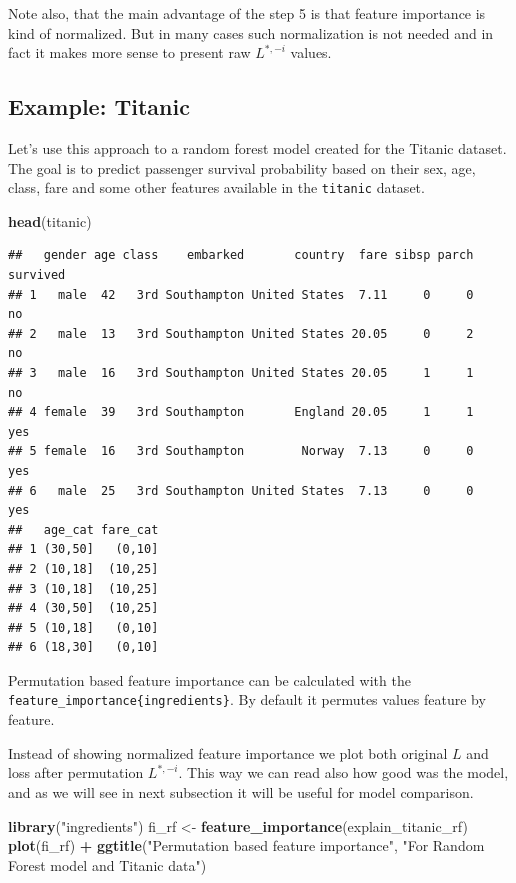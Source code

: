 \documentclass[12pt,]{krantz}
\newenvironment{Shaded}{\begin{snugshade}}{\end{snugshade}}
\newcommand{\KeywordTok}[1]{\textcolor[rgb]{0.13,0.29,0.53}{\textbf{#1}}}
\newcommand{\NormalTok}[1]{#1}
\newcommand{\OperatorTok}[1]{\textcolor[rgb]{0.81,0.36,0.00}{\textbf{#1}}}
\newcommand{\StringTok}[1]{\textcolor[rgb]{0.31,0.60,0.02}{#1}}
\theoremstyle{definition}
\theoremstyle{definition}
\theoremstyle{definition}
\theoremstyle{remark}
\begin{document}
Note also, that the main advantage of the step 5 is that feature
importance is kind of normalized. But in many cases such normalization
is not needed and in fact it makes more sense to present raw
\(L^{*,-i}\) values.

\hypertarget{example-titanic-1}{%
\subsection{Example: Titanic}\label{example-titanic-1}}

Let's use this approach to a random forest model created for the Titanic
dataset. The goal is to predict passenger survival probability based on
their sex, age, class, fare and some other features available in the
\texttt{titanic} dataset.

\begin{Shaded}
\begin{Highlighting}[]
\KeywordTok{head}\NormalTok{(titanic)}
\end{Highlighting}
\end{Shaded}

\begin{verbatim}
##   gender age class    embarked       country  fare sibsp parch survived
## 1   male  42   3rd Southampton United States  7.11     0     0       no
## 2   male  13   3rd Southampton United States 20.05     0     2       no
## 3   male  16   3rd Southampton United States 20.05     1     1       no
## 4 female  39   3rd Southampton       England 20.05     1     1      yes
## 5 female  16   3rd Southampton        Norway  7.13     0     0      yes
## 6   male  25   3rd Southampton United States  7.13     0     0      yes
##   age_cat fare_cat
## 1 (30,50]   (0,10]
## 2 (10,18]  (10,25]
## 3 (10,18]  (10,25]
## 4 (30,50]  (10,25]
## 5 (10,18]   (0,10]
## 6 (18,30]   (0,10]
\end{verbatim}

Permutation based feature importance can be calculated with the
\texttt{feature\_importance\{ingredients\}}. By default it permutes
values feature by feature.

Instead of showing normalized feature importance we plot both original
\(L\) and loss after permutation \(L^{*,-i}\). This way we can read also
how good was the model, and as we will see in next subsection it will be
useful for model comparison.

\begin{Shaded}
\begin{Highlighting}[]
\KeywordTok{library}\NormalTok{(}\StringTok{"ingredients"}\NormalTok{)}
\NormalTok{fi_rf <-}\StringTok{ }\KeywordTok{feature_importance}\NormalTok{(explain_titanic_rf) }
\KeywordTok{plot}\NormalTok{(fi_rf) }\OperatorTok{+}\StringTok{ }\KeywordTok{ggtitle}\NormalTok{(}\StringTok{"Permutation based feature importance"}\NormalTok{, }\StringTok{"For Random Forest model and Titanic data"}\NormalTok{)}
\end{Highlighting}
\end{Shaded}
\end{document}
